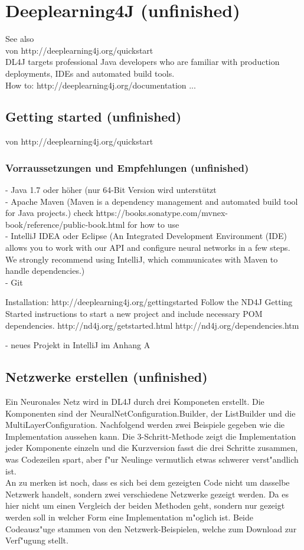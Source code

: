 \chapter{Deeplearning4J (unfinished)}
{See also \cite{DL4J}\\
von http://deeplearning4j.org/quickstart\\
DL4J targets professional Java developers who are familiar with production deployments, IDEs and automated build tools.\\

How to:
http://deeplearning4j.org/documentation
...

\section{Getting started (unfinished)}
von http://deeplearning4j.org/quickstart\\

\subsection{Vorraussetzungen und Empfehlungen (unfinished)}
- Java 1.7 oder höher (nur 64-Bit Version wird unterstützt\\
- Apache Maven (Maven is a dependency management and automated build tool for Java projects.) check https://books.sonatype.com/mvnex-book/reference/public-book.html for how to use\\
- IntelliJ IDEA oder Eclipse (An Integrated Development Environment (IDE) allows you to work with our API and configure neural networks in a few steps. We strongly recommend using IntelliJ, which communicates with Maven to handle dependencies.)\\
- Git

Installation:
http://deeplearning4j.org/gettingstarted
Follow the ND4J Getting Started instructions to start a new project and include necessary POM dependencies.
http://nd4j.org/getstarted.html
http://nd4j.org/dependencies.htm

- neues Projekt in IntelliJ im Anhang A


\section{Netzwerke erstellen (unfinished)}
Ein Neuronales Netz wird in DL4J durch drei Komponeten erstellt. Die Komponenten sind der NeuralNetConfiguration.Builder, der ListBuilder und die MultiLayerConfiguration. Nachfolgend werden zwei Beispiele gegeben wie die Implementation aussehen kann. Die 3-Schritt-Methode zeigt die Implementation jeder Komponente einzeln und die Kurzversion fasst die drei Schritte zusammen, was Codezeilen spart, aber f"ur Neulinge vermutlich etwas schwerer verst"andlich ist.\\
An zu merken ist noch, dass es sich bei dem gezeigten Code nicht um dasselbe Netzwerk handelt, sondern zwei verschiedene Netzwerke gezeigt werden. Da es hier nicht um einen Vergleich der beiden Methoden geht, sondern nur gezeigt werden soll in welcher Form eine Implementation m"oglich ist. Beide Codeausz"uge stammen von den Netzwerk-Beispielen, welche \cite{DL4J} zum Download zur Verf"ugung stellt.

}
